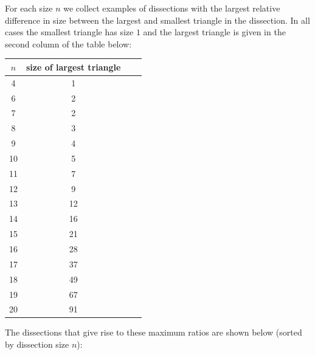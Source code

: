 \documentclass[12pt,amstags,fleqn]{article}
\theoremstyle{plain}
\theoremstyle{definition}
\begin{document}
For each size $n$ we collect examples of dissections with the largest
relative difference in size between the largest and smallest triangle in
the dissection. In all cases the smallest triangle has size $1$ and the
largest triangle  is given in the second column of the table below:

\begin{center}
\begin{tabular}{|c|c|c|c|}
\hline
$n$ & size of largest triangle \\
\hline
\hline 4 & 1 \\
\hline 6 & 2 \\
\hline 7 & 2 \\
\hline 8 & 3 \\
\hline 9 & 4 \\
\hline 10 & 5 \\
\hline 11 & 7 \\
\hline 12 & 9 \\
\hline 13 & 12 \\
\hline 14 & 16 \\
\hline 15 & 21 \\
\hline 16 & 28 \\
\hline 17 & 37 \\
\hline 18 & 49 \\
\hline 19 & 67 \\
\hline 20 & 91 \\
\hline
\end{tabular}
\end{center}

The dissections that give rise to these maximum ratios are shown below
(sorted by dissection size $n$):
\end{document}
